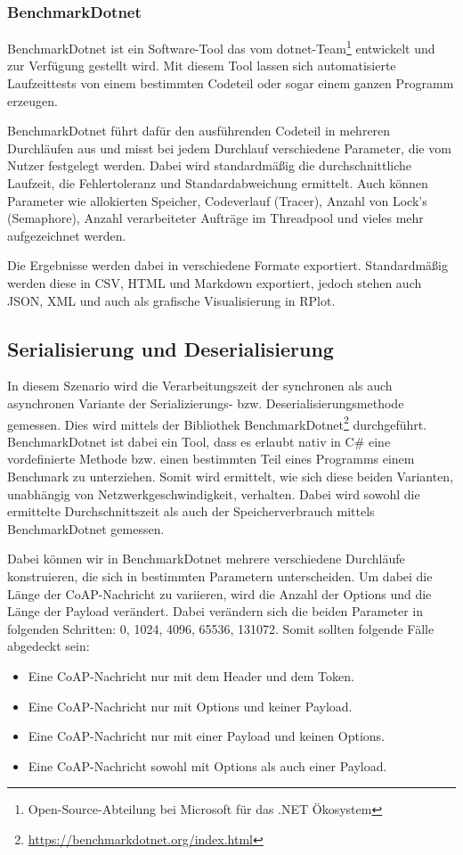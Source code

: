 \subsubsection{BenchmarkDotnet}
\label{BenchmarkDotnet}

BenchmarkDotnet ist ein Software-Tool das vom dotnet-Team\footnote{Open-Source-Abteilung bei Microsoft für das .NET Ökosystem} entwickelt und zur Verfügung gestellt wird. Mit diesem Tool lassen sich automatisierte Laufzeittests von einem bestimmten Codeteil oder sogar einem ganzen Programm erzeugen.

BenchmarkDotnet führt dafür den ausführenden Codeteil in mehreren Durchläufen aus und misst bei jedem Durchlauf verschiedene Parameter, die vom Nutzer festgelegt werden. Dabei wird standardmäßig die durchschnittliche Laufzeit, die Fehlertoleranz und Standardabweichung ermittelt. Auch können Parameter wie allokierten Speicher, Codeverlauf (Tracer), Anzahl von Lock's (Semaphore), Anzahl verarbeiteter Aufträge im Threadpool und vieles mehr aufgezeichnet werden.

Die Ergebnisse werden dabei in verschiedene Formate exportiert. Standardmäßig werden diese in CSV, HTML und Markdown exportiert, jedoch stehen auch JSON, XML und auch als grafische Visualisierung in RPlot.

\subsection{Serialisierung und Deserialisierung}
\label{subsec:serializierung-und-deserializierung}

In diesem Szenario wird die Verarbeitungszeit der synchronen als auch asynchronen Variante der Serializierungs- bzw. Deserialisierungsmethode gemessen. Dies wird mittels der Bibliothek BenchmarkDotnet\footnote{\href{https://benchmarkdotnet.org/index.html}{https://benchmarkdotnet.org/index.html}} durchgeführt. BenchmarkDotnet ist dabei ein Tool, dass es erlaubt nativ in C\# eine vordefinierte Methode bzw. einen bestimmten Teil eines Programms einem Benchmark zu unterziehen. Somit wird ermittelt, wie sich diese beiden Varianten, unabhängig von Netzwerkgeschwindigkeit, verhalten. Dabei wird sowohl die ermittelte Durchschnittszeit als auch der Speicherverbrauch mittels BenchmarkDotnet gemessen.

Dabei können wir in BenchmarkDotnet mehrere verschiedene Durchläufe konstruieren, die sich in bestimmten Parametern unterscheiden. Um dabei die Länge der CoAP-Nachricht zu variieren, wird die Anzahl der Options und die Länge der Payload verändert. Dabei verändern sich die beiden Parameter in folgenden Schritten: 0, 1024, 4096, 65536, 131072. Somit sollten folgende Fälle abgedeckt sein:
\begin{itemize}
    \item Eine CoAP-Nachricht nur mit dem Header und dem Token.
    \item Eine CoAP-Nachricht nur mit Options und keiner Payload.
    \item Eine CoAP-Nachricht nur mit einer Payload und keinen Options.
    \item Eine CoAP-Nachricht sowohl mit Options als auch einer Payload.
\end{itemize}

